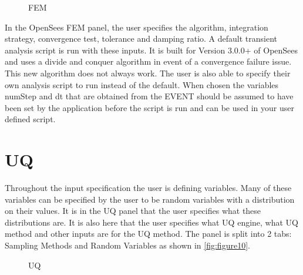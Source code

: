 \begin{figure}[!htbp]
  \caption{FEM}
  \label{fig:figure9}
\end{figure}

In the OpenSees FEM panel, the user specifies the algorithm, integration strategy, convergence test, tolerance and damping ratio. 
A default transient analysis script is run with these inputs. It is built for Version 3.0.0+ of OpenSees and uses a divide and conquer 
algorithm in event of a convergence failure issue. This new algorithm does not always work. The user is also able to specify their 
own analysis script to run instead of the default. When chosen the variables numStep and dt that are obtained from the EVENT 
should be assumed to have been set by the application before the script is run and can be used in your user defined script.

\section{UQ}
Throughout the input specification the user is defining variables. Many of these variables can be specified by the user to be 
random variables with a distribution on their values. It is in the UQ panel that the user specifies what these distributions are. 
It is also here that the user specifies what UQ engine, what UQ method and other inputs are for the UQ method. 
The panel is split into 2 tabs: Sampling Methods and Random Variables as shown in \autoref{fig:figure10}.

\begin{figure}[!htbp]
  \caption{UQ}
  \label{fig:figure10}
\end{figure}


